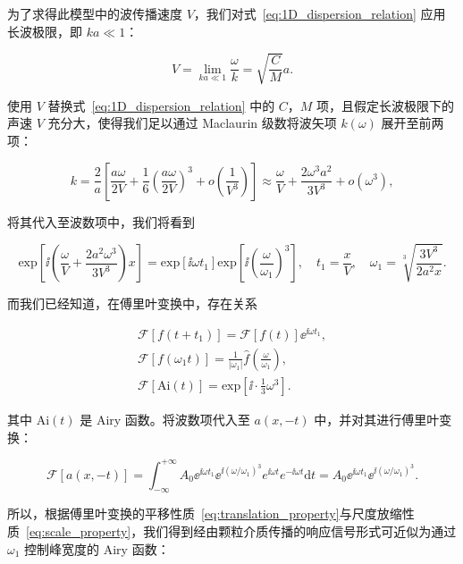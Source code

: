 为了求得此模型中的波传播速度 $V$，我们对式~\eqref{eq:1D_dispersion_relation} 应用长波极限，即 $ka\ll 1$：

\begin{equation}
  V = \lim_{ka\ll 1}\frac{\omega}{k} = \sqrt{\frac{C}{M}}a.
\end{equation}

使用 $V$ 替换式~\eqref{eq:1D_dispersion_relation} 中的 $C$，$M$ 项，且假定长波极限下的声速 $V$ 充分大，使得我们足以通过 Maclaurin 级数将波矢项 $k(\omega)$ 展开至前两项：

\begin{equation}
  k = \frac{2}{a}\left[\frac{a\omega}{2V} + \frac{1}{6}\left(\frac{a\omega}{2V}\right)^{3} + o\left(\frac{1}{V^3}\right)\right]\approx\frac{\omega}{V} + \frac{2\omega^{3}a^{2}}{3V^{3}}+o(\omega^{3}),
\end{equation}

将其代入至波数项中，我们将看到

\begin{equation}
  \text{exp}\left[{\ii \left(\frac{\omega}{V} + \frac{2a^{2}\omega^{3}}{3V^{3}}\right)x}\right] = \text{exp}[{\ii\omega t_{1}}]\text{exp}\left[{\ii\left(\frac{\omega}{\omega_{1}}\right)^{3}}\right],\quad t_{1} = \frac{x}{V},\quad \omega_{1} = \sqrt[3]{\frac{3V^{3}}{2a^{2}x}}.\label{eq:rescale_method}
\end{equation}

而我们已经知道，在傅里叶变换中，存在关系

\begin{align}
  \mathcal{F}[f(t+t_{1})] = \mathcal{F}[f(t)]{\ee}^{\ii\omega t_{1}},\label{eq:translation_property}\\
  \mathcal{F}[f(\omega_{1}t)] = \frac{1}{|\omega_{1}|}\hat{f}\left(\frac{\omega}{\omega_{1}}\right),\label{eq:scale_property}\\
  \mathcal{F}[\text{Ai}(t)] = \text{exp}\left[\ii\cdot \frac{1}{3}\omega^3\right].
\end{align}

其中 $\text{Ai}(t)$ 是 Airy 函数。将波数项代入至 $a(x,-t)$ 中，并对其进行傅里叶变换：

\begin{equation}
  \mathcal{F}[a(x,-t)] = \int_{-\infty}^{+\infty}A_{0}{\ee}^{\ii\omega t_{1}}{\ee}^{\ii(\omega/\omega_{1})^{3}}e^{\ii\omega t}e^{-\ii\omega t}\mathrm{d}t = A_{0}{\ee}^{\ii\omega t_{1}}{\ee}^{\ii(\omega/\omega_{1})^{3}}.
\end{equation}

所以，根据傅里叶变换的平移性质~\eqref{eq:translation_property}与尺度放缩性质~\eqref{eq:scale_property}，我们得到经由颗粒介质传播的响应信号形式可近似为通过 $\omega_{1}$ 控制峰宽度的 Airy 函数：

